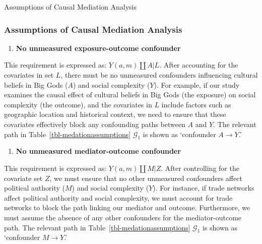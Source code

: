 \documentclass[
  single column]{article}
\providecommand{\tightlist}{%
  \setlength{\itemsep}{0pt}\setlength{\parskip}{0pt}}\usepackage{longtable,booktabs,array}
\begin{document}
\begin{table}

\caption{\label{tbl-medationassumptions}Assumptions of Causal Mediation
Analysis}

\centering{

\mediationassumptionsswig

}

\end{table}%

\subsubsection{Assumptions of Causal Mediation
Analysis}\label{assumptions-of-causal-mediation-analysis}

\begin{enumerate}
\def\labelenumi{\arabic{enumi}.}
\tightlist
\item
  \textbf{No unmeasured exposure-outcome confounder}
\end{enumerate}

This requirement is expressed as: \(Y(a,m) \coprod A | L\). After
accounting for the covariates in set \(L\), there must be no unmeasured
confounders influencing cultural beliefs in Big Gods (\(A\)) and social
complexity (\(Y\)). For example, if our study examines the causal effect
of cultural beliefs in Big Gods (the exposure) on social complexity (the
outcome), and the covariates in \(L\) include factors such as geographic
location and historical context, we need to ensure that these covariates
effectively block any confounding paths between \(A\) and \(Y\). The
relevant path in Table~\ref{tbl-medationassumptions} \(\mathcal{G}_1\)
is shown as `confounder \(A \to Y\).'

\begin{enumerate}
\def\labelenumi{\arabic{enumi}.}
\setcounter{enumi}{1}
\tightlist
\item
  \textbf{No unmeasured mediator-outcome confounder}
\end{enumerate}

This requirement is expressed as: \(Y(a,m) \coprod M | Z\). After
controlling for the covariate set \(Z\), we must ensure that no other
unmeasured confounders affect political authority (\(M\)) and social
complexity (\(Y\)). For instance, if trade networks affect political
authority and social complexity, we must account for trade networks to
block the path linking our mediator and outcome. Furthermore, we must
assume the absence of any other confounders for the mediator-outcome
path. The relevant path in Table~\ref{tbl-medationassumptions}
\(\mathcal{G}_1\) is shown as `confounder \(M \to Y\).'
\end{document}
